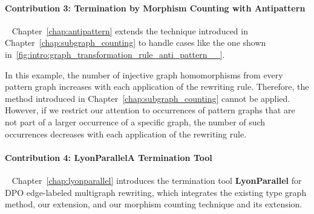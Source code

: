 \paragraph{Contribution 3: Termination by Morphism Counting with Antipattern}
\ \newline
Chapter~\ref{chap:antipattern} extends the technique introduced in Chapter~\ref{chap:subgraph_counting} to handle cases like the one shown in~\autoref{fig:intro:graph_transformation_rule_anti_pattern__}.
 \begin{figure}[H]
    \centering
{}
  \caption{}
  \label{fig:intro:graph_transformation_rule_anti_pattern__}
 \end{figure} 
In this example, the number of injective graph homomorphisms from every pattern graph increases with each application of the rewriting rule. Therefore, the method introduced in Chapter~\ref{chap:subgraph_counting} cannot be applied. However, if we restrict our attention to occurrences of pattern graphs that are not part of a larger occurrence of a specific graph, the number of such occurrences decreases with each application of the rewriting rule. 

\paragraph{Contribution 4: LyonParallel\textemdash A Termination Tool}
\ \newline
Chapter~\ref{chap:lyonparallel} introduces the termination tool \textbf{LyonParallel} for DPO edge-labeled multigraph rewriting, which integrates the existing type graph method, our extension, and our morphism counting technique and its extension.  